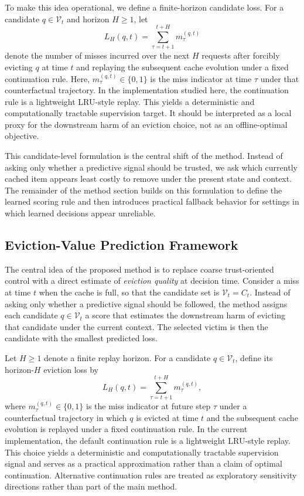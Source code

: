 \documentclass[preprint,12pt]{elsarticle}
\begin{document}
To make this idea operational, we define a finite-horizon candidate loss. For a candidate $q \in \mathcal{V}_t$ and horizon $H \geq 1$, let
\begin{equation}
L_H(q,t) = \sum_{\tau=t+1}^{t+H} m_{\tau}^{(q,t)}
\label{eq:horizon-loss}
\end{equation}
denote the number of misses incurred over the next $H$ requests after forcibly evicting $q$ at time $t$ and replaying the subsequent cache evolution under a fixed continuation rule. Here, $m_{\tau}^{(q,t)} \in \{0,1\}$ is the miss indicator at time $\tau$ under that counterfactual trajectory. In the implementation studied here, the continuation rule is a lightweight LRU-style replay. This yields a deterministic and computationally tractable supervision target. It should be interpreted as a local proxy for the downstream harm of an eviction choice, not as an offline-optimal objective.

This candidate-level formulation is the central shift of the method. Instead of asking only whether a predictive signal should be trusted, we ask which currently cached item appears least costly to remove under the present state and context. The remainder of the method section builds on this formulation to define the learned scoring rule and then introduces practical fallback behavior for settings in which learned decisions appear unreliable.
\subsection{Eviction-Value Prediction Framework}
\label{subsec:eviction_value_framework}

The central idea of the proposed method is to replace coarse trust-oriented control with a direct estimate of \emph{eviction quality} at decision time. Consider a miss at time $t$ when the cache is full, so that the candidate set is $\mathcal{V}_t = C_t$. Instead of asking only whether a predictive signal should be followed, the method assigns each candidate $q \in \mathcal{V}_t$ a score that estimates the downstream harm of evicting that candidate under the current context. The selected victim is then the candidate with the smallest predicted loss.

Let $H \geq 1$ denote a finite replay horizon. For a candidate $q \in \mathcal{V}_t$, define its horizon-$H$ eviction loss by
\begin{equation}
L_H(q,t) = \sum_{\tau=t+1}^{t+H} m_{\tau}^{(q,t)},
\label{eq:eviction_loss}
\end{equation}
where $m_{\tau}^{(q,t)} \in \{0,1\}$ is the miss indicator at future step $\tau$ under a counterfactual trajectory in which $q$ is evicted at time $t$ and the subsequent cache evolution is replayed under a fixed continuation rule. In the current implementation, the default continuation rule is a lightweight LRU-style replay. This choice yields a deterministic and computationally tractable supervision signal and serves as a practical approximation rather than a claim of optimal continuation. Alternative continuation rules are treated as exploratory sensitivity directions rather than part of the main method.
\end{document}
